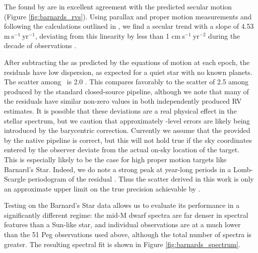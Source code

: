 \documentclass[modern]{aastex62}
\newcommand{\Mdwarf}{Barnard's Star\xspace} %
\begin{document}
The \RVs found by \wobble are in excellent agreement with the predicted secular motion (Figure \ref{fig:barnards_rvs}).
Using \gaia parallax and proper motion measurements and following the calculations outlined in \citet{Kurster2003}, we find a secular trend with a slope of 4.53 $\mathrm{m}~\mathrm{s}^{-1}~\mathrm{yr}^{-1}$, deviating from this linearity by less than 1 $\mathrm{cm}~\mathrm{s}^{-1}~\mathrm{yr}^{-2}$ during the decade of \HARPS observations \citep{gaia2016, gaia2018}.

After subtracting the \RVs as predicted by the equations of motion at each epoch, the residuals have low dispersion, as expected for a quiet star with no known planets.
The  scatter among \wobble\ \RVs is 2.0 \ms.
This compares favorably to the scatter of 2.5 \ms among \RVs produced by the standard closed-source \HARPS pipeline, although we note that many of the residuals have similar non-zero values in both independently produced RV estimates.
It is possible that these deviations are a real physical effect in the stellar spectrum, but we caution that approximately \ms-level errors are likely being introduced by the barycentric correction.
Currently we assume that the \BERV provided by the native \HARPS pipeline is correct, but this will not hold true if the sky coordinates entered by the observer deviate from the actual on-sky location of the target.
This is especially likely to be the case for high proper motion targets like \Mdwarf.
Indeed, we do note a strong peak at year-long periods in a Lomb-Scargle periodogram of the residual \RVs.
Thus the \RV scatter derived in this work is only an approximate upper limit on the true precision achievable by \wobble. 

Testing \wobble on the \Mdwarf data allows us to evaluate its performance in a significantly different regime: the mid-M dwarf spectra are far denser in spectral features than a Sun-like star, and individual observations are at a much lower \SNR than the 51 Peg observations used above, although the total number of spectra is greater.
The resulting spectral fit is shown in Figure \ref{fig:barnards_spectrum}.
\end{document}
